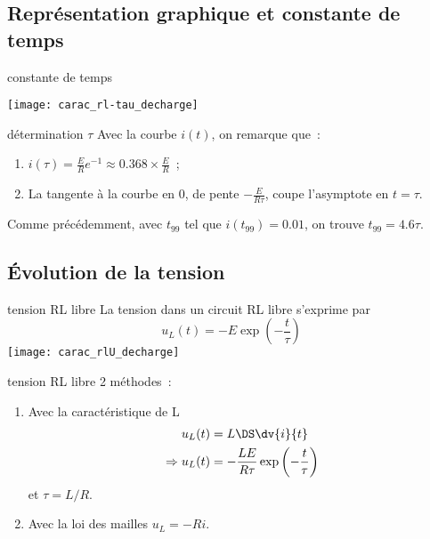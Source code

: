 \documentclass[../main/main.tex]{subfiles}
\begin{document}
\subsection{Représentation graphique et constante de temps}
\begin{tcbraster}[raster columns=2, raster equal height=rows]
    \begin{impl}[label=impl:tauRC]{constante de temps}
        \begin{center}
            \texttt{[image: carac\_rl-tau\_decharge]}
        \end{center}
    \end{impl}
    \begin{exem}[label=impl:déterm]{détermination $\tau$}
        Avec la courbe $i(t)$, on remarque que~:
        \begin{enumerate}
            \item $i(\tau) = \frac{E}{R} e^{-1} \approx \num{0.368}\times
                \frac{E}{R}$~;
            \item La tangente à la courbe en 0, de pente $-\frac{E}{R\tau}$,
                coupe l'asymptote en $t = \tau$.
        \end{enumerate}
        Comme précédemment, avec $t_{99}$ tel que $i(t_{99}) = \num{0.01}$, on
        trouve $t_{99} = \num{4.6}\tau$.
    \end{exem}
\end{tcbraster}

\subsection{Évolution de la tension}

\begin{tcbraster}[raster columns=2, raster equal height=rows]
    \begin{prop}[label=prop:irc-charge, sidebyside,
        righthand width=.15\linewidth]{tension RL libre}
        La tension dans un circuit RL libre s'exprime par
        \[\boxed{u_L(t) = -E\exp \left(-\frac{t}{\tau} \right)}\]
        \tcblower
        \hspace*{-12pt}\texttt{[image: carac\_rlU\_decharge]}
    \end{prop}
    \begin{demo}[label=demo:url-decharge]{tension RL libre}
        2 méthodes~:
        \begin{enumerate}
            \item Avec la caractéristique de L
                \begin{align*}
                                u_L(t) &= L\DS \dv{i}{t}\\
                    \Rightarrow u_L(t) &= - \frac{LE}{R\tau} \exp \left(-
                    \frac{t}{\tau} \right)
                \end{align*}
                et $\tau = L/R$.
            \item Avec la loi des mailles $u_L = -Ri$.
        \end{enumerate}
    \end{demo}
\end{tcbraster}
\end{document}
